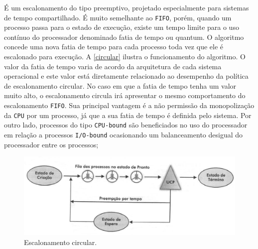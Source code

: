\begin{itemize}
É um escalonamento do tipo preemptivo, projetado especialmente para sistemas de tempo compartilhado. É muito semelhante ao \texttt{FIFO}, porém, quando um processo passa para o estado de execução, existe um tempo limite para o uso contínuo do processador denominado fatia de tempo ou quantum. O algoritmo concede uma nova fatia de tempo para cada processo toda vez que ele é escalonado para execução. A \autoref{circular} ilustra o funcionamento do algoritmo. O valor da fatia de tempo varia de acordo da arquitetura de cada sistema operacional e este valor está diretamente relacionado ao desempenho da política de escalonamento circular. No caso em que a fatia de tempo tenha um valor muito alto, o escalonamento circula irá apresentar o mesmo comportamento do escalonamento \texttt{FIFO}. Sua principal vantagem é a não permissão da monopolização da \texttt{CPU} por um processo, já que a sua fatia de tempo é definida pelo sistema. Por outro lado, processos do tipo \texttt{CPU-bound} são beneficiados no uso do processador em relação a processos \texttt{I/O-bound} ocasionando um balanceamento desigual do processador entre os processos;

\begin{figure}[h]
	\centering
	\caption{\label{circular}Escalonamento circular.}
		\includegraphics[keepaspectratio=true,scale=0.5]{figuras/circular.eps}
\end{figure}


\end{itemize}
